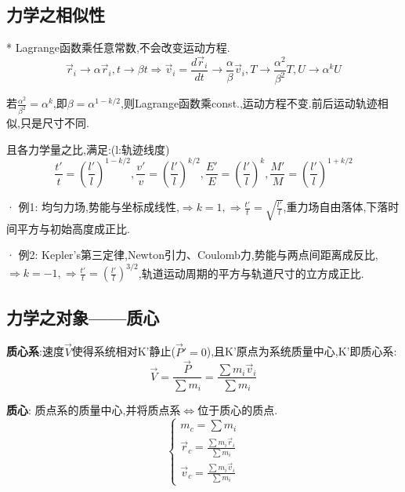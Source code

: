 \documentclass{article}
\begin{document}
\subsection{力学之相似性}
    * Lagrange函数乘任意常数,不会改变运动方程.
        $$\vec r_i \to \alpha \vec r_i, t \to \beta t 
        \Rightarrow \vec v_i = \frac{d\vec r_i}{dt} \to \frac{\alpha}{\beta}\vec v_i,T \to \frac{\alpha^2}{\beta^2}T,U \to  \alpha^k U$$
    
    若$\frac{\alpha^2}{\beta^2} = \alpha ^ k $,即$\beta = \alpha^{1-k/2}$,则Lagrange函数乘const.,运动方程不变.前后运动轨迹相似,只是尺寸不同.
    
    且各力学量之比,满足:\quad(l:轨迹线度)
        $$\frac{t'}{t} = (\frac{l'}{l})^{1-k/2},\frac{v'}{v} = (\frac{l'}{l})^{k/2},\frac{E'}{E} = (\frac{l'}{l})^k,\frac{M'}{M} = (\frac{l'}{l})^{1+k/2}$$
        
    · 例1: 均匀力场,势能与坐标成线性,$\Rightarrow k=1,\Rightarrow \frac{t'}{t} = \sqrt{\frac{l'}{l}}$,重力场自由落体,下落时间平方与初始高度成正比.
    
    · 例2: Kepler's第三定律,Newton引力、Coulomb力,势能与两点间距离成反比,$\Rightarrow k=-1,\Rightarrow \frac{t'}{t} = (\frac{l'}{l})^{3/2}$,轨道运动周期的平方与轨道尺寸的立方成正比.


    \subsection{力学之对象——质心}
        \textbf{质心系}:\exists 速度$\vec V$使得系统相对K'静止($\vec P' = 0$),且K'原点为系统质量中心,K'即质心系:
            $$\vec V = \frac{\vec P}{\sum m_i} = \frac{\sum m_i \vec v_i}{\sum m_i}$$
            
        \textbf{质心}: 质点系的质量中心,并将质点系$\Leftrightarrow$位于质心的质点.
            \begin{displaymath}
                \left\{ \begin{array}{ll}
                m_c = \sum m_i\\
                \vec r_c = \frac{\sum m_i \vec r_i}{\sum m_i}\\
                \vec v_c = \frac{\sum m_i \vec v_i}{\sum m_i}
                \end{array} \right.
            \end{displaymath}
            
\end{document}

